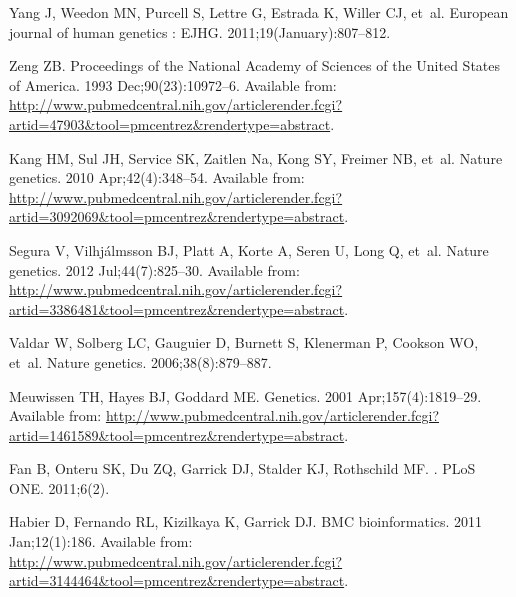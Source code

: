 \documentclass[10pt,letterpaper]{article}
\begin{document}
\begin{thebibliography}{}
Yang J, Weedon MN, Purcell S, Lettre G, Estrada K, Willer CJ, et~al.
\newblock European journal of human genetics : EJHG. 2011;19(January):807--812.

Zeng ZB.
\newblock Proceedings of the National Academy of Sciences of the United States
  of America. 1993 Dec;90(23):10972--6.
\newblock Available from:
  \url{http://www.pubmedcentral.nih.gov/articlerender.fcgi?artid=47903\&tool=pmcentrez\&rendertype=abstract}.

Kang HM, Sul JH, Service SK, Zaitlen Na, Kong SY, Freimer NB, et~al.
\newblock Nature genetics. 2010 Apr;42(4):348--54.
\newblock Available from:
  \url{http://www.pubmedcentral.nih.gov/articlerender.fcgi?artid=3092069\&tool=pmcentrez\&rendertype=abstract}.

Segura V, Vilhj\'{a}lmsson BJ, Platt A, Korte A, Seren U, Long Q, et~al.
\newblock Nature genetics. 2012 Jul;44(7):825--30.
\newblock Available from:
  \url{http://www.pubmedcentral.nih.gov/articlerender.fcgi?artid=3386481\&tool=pmcentrez\&rendertype=abstract}.

Valdar W, Solberg LC, Gauguier D, Burnett S, Klenerman P, Cookson WO, et~al.
\newblock Nature genetics. 2006;38(8):879--887.

Meuwissen TH, Hayes BJ, Goddard ME.
\newblock Genetics. 2001 Apr;157(4):1819--29.
\newblock Available from:
  \url{http://www.pubmedcentral.nih.gov/articlerender.fcgi?artid=1461589\&tool=pmcentrez\&rendertype=abstract}.

Fan B, Onteru SK, Du ZQ, Garrick DJ, Stalder KJ, Rothschild MF.
.
\newblock PLoS ONE. 2011;6(2).

Habier D, Fernando RL, Kizilkaya K, Garrick DJ.
\newblock BMC bioinformatics. 2011 Jan;12(1):186.
\newblock Available from:
  \url{http://www.pubmedcentral.nih.gov/articlerender.fcgi?artid=3144464\&tool=pmcentrez\&rendertype=abstract}.


\end{thebibliography}
\end{document}
